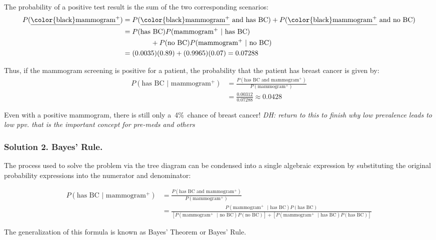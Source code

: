 The probability of a positive test result is the sum of the two corresponding scenarios:
\begin{align*}
P(\text{\underline{\color{black}mammogram$^+$}}) &= P(\text{\underline{\color{black}mammogram$^+$} and has BC}) + P(\text{\underline{\color{black}mammogram$^+$} and no BC}) \\
	&= P(\text{has BC})P(\text{mammogram$^+$ } | \text{ has BC}) \\
	&\qquad\qquad	+ P(\text{no BC})P(\text{mammogram$^+$ } | \text{ no BC}) \\
	&= (0.0035)(0.89) + (0.9965)(0.07) = 0.07288
\end{align*}

Thus, if the mammogram screening is positive for a patient, the probability that the patient has breast cancer is given by: 
\begin{align*}
P(\text{has BC } | \text{ mammogram$^+$})
	&= \frac{P(\text{has BC and mammogram$^+$})}{P(\text{mammogram$^+$})}\\
	&= \frac{0.00312}{0.07288} \approx 0.0428
\end{align*}

Even with a positive mammogram, there is still only a~4\%~chance of breast cancer!   \textit{DH: return to this to finish why low prevalence leads to low ppv. that is the important concept for pre-meds and others}

\subsubsection{Solution 2. Bayes' Rule.}

The process used to solve the problem via the tree diagram can be condensed into a single algebraic expression by substituting the original probability expressions into the numerator and denominator:

\begin{align*}
P(\text{has BC } | \text{ mammogram$^+$})
&= \frac{P(\text{has BC and mammogram$^+$})}{P(\text{mammogram$^+$})} \\
&= \frac{P(\text{mammogram$^+$ } | \text{ has BC})  P(\text{has BC})}
{[P(\text{mammogram$^+$ } | \text{ no BC}) P(\text{no BC})] + [P(\text{mammogram$^+$ } | \text{ has BC}) P(\text{has BC})]}
\end{align*}

The generalization of this formula is known as Bayes' Theorem or Bayes' Rule.

